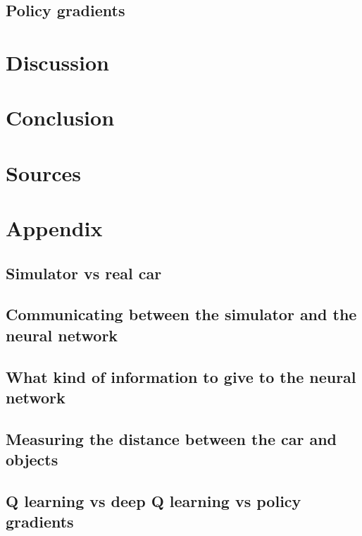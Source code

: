 \documentclass{article}
\begin{document}
\subsection{Policy gradients}

\section{Discussion}

\section{Conclusion}

\section{Sources}

\section{Appendix}
\subsection{Simulator vs real car}
\subsection{Communicating between the simulator and the neural network}
\subsection{What kind of information to give to the neural network}
\subsection{Measuring the distance between the car and objects}
\subsection{Q learning vs deep Q learning vs policy gradients}
\end{document}
